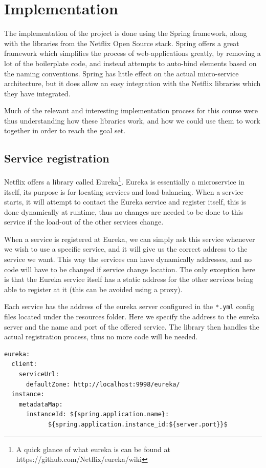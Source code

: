 \documentclass[a4paper,11pt,oneside]{book}
\begin{document}
%
%
\chapter{Implementation}
The implementation of the project is done using the Spring framework, along with the libraries from the Netflix Open Source stack. Spring offers a great framework which simplifies the process of web-applications greatly, by removing a lot of the boilerplate code, and instead attempts to auto-bind elements based on the naming conventions. Spring has little effect on the actual micro-service architecture, but it does allow an easy integration with the Netflix libraries which they have integrated.

Much of the relevant and interesting implementation process for this course were thus understanding how these libraries work, and how we could use them to work together in order to reach the goal set.

\section{Service registration}
Netflix offers a library called Eureka\footnote{A quick glance of what eureka is can be found at https://github.com/Netflix/eureka/wiki}. Eureka is essentially a microservice in itself, its purpose is for locating services and load-balancing. When a service starts, it will attempt to contact the Eureka service and register itself, this is done dynamically at runtime, thus no changes are needed to be done to this service if the load-out of the other services change.

When a service is registered at Eureka, we can simply ask this service whenever we wish to use a specific service, and it will give us the correct address to the service we want. This way the services can have dynamically addresses, and no code will have to be changed if service change location. The only exception here is that the Eureka service itself has a static address for the other services being able to register at it (this can be avoided using a proxy).

Each service has the address of the eureka server configured in the \texttt{*.yml} config files located under the resources folder.  Here we specify the address to the eureka server and the name and port of the offered service. The library then handles the actual registration process, thus no more code will be needed.

\begin{verbatim}
eureka:
  client:
    serviceUrl:
      defaultZone: http://localhost:9998/eureka/
  instance:
    metadataMap:
      instanceId: ${spring.application.name}:
      		${spring.application.instance_id:${server.port}}$
\end{verbatim}
\end{document}
